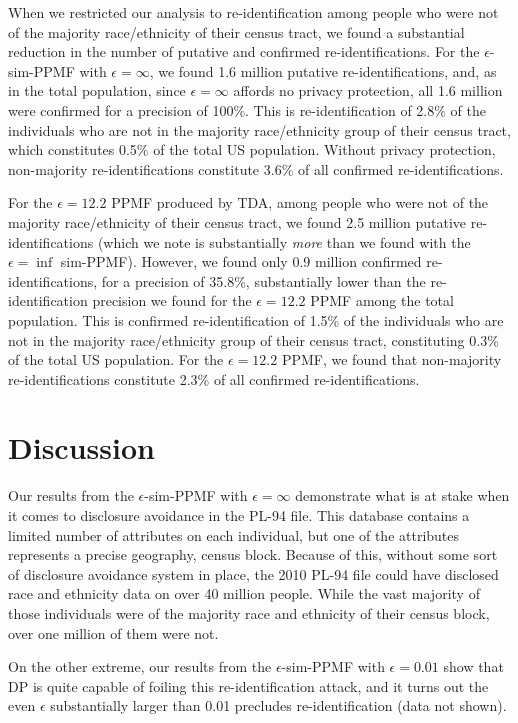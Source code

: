 \documentclass{article}
\begin{document}
When we restricted our analysis to re-identification among people who were not of the majority race/ethnicity of their census tract, we found a substantial reduction in the number of putative and confirmed re-identifications.  For the $\epsilon$-sim-PPMF with $\epsilon=\infty$, we found 1.6 million putative re-identifications, and, as in the total population, since $\epsilon=\infty$ affords no privacy protection, all 1.6 million were confirmed for a precision of 100\%.  This is re-identification of 2.8\% of the individuals who are not in the majority race/ethnicity group of their census tract, which constitutes 0.5\% of the total US population.  Without privacy protection, non-majority re-identifications constitute 3.6\% of all confirmed re-identifications.

For the $\epsilon=12.2$ PPMF produced by TDA, among people who were not of the majority race/ethnicity of their census tract, we found 2.5 million putative re-identifications (which we note is substantially \emph{more} than we found with the $\epsilon=\inf$ sim-PPMF).  However, we found only 0.9 million confirmed re-identifications, for a precision of 35.8\%, substantially lower than the re-identification precision we found for the $\epsilon=12.2$ PPMF among the total population.  This is confirmed re-identification of 1.5\% of the individuals who are not in the majority race/ethnicity group of their census tract, constituting 0.3\% of the total US population.  For the $\epsilon=12.2$ PPMF, we found that non-majority re-identifications constitute 2.3\% of all confirmed re-identifications.



\section{Discussion}

Our results from the $\epsilon$-sim-PPMF with $\epsilon=\infty$ demonstrate what is at stake when it comes to disclosure avoidance in the PL-94 file.  This database contains a limited number of attributes on each individual, but one of the attributes represents a precise geography, census block.  Because of this, without some sort of disclosure avoidance system in place, the 2010 PL-94 file could have disclosed race and ethnicity data on over 40 million people.  While the vast majority of those individuals were of the majority race and ethnicity of their census block, over one million of them were not.

On the other extreme, our results from the $\epsilon$-sim-PPMF with $\epsilon=0.01$ show that DP is quite capable of foiling this re-identification attack, and it turns out the even $\epsilon$ substantially larger than 0.01 precludes re-identification (data not shown).
\end{document}

